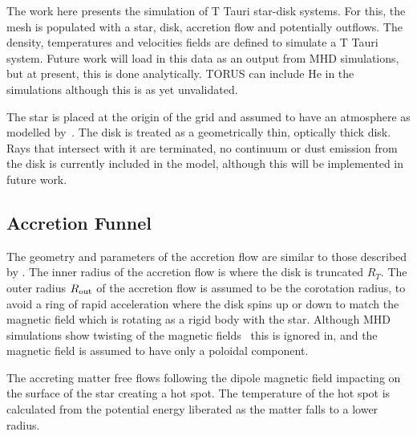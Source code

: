 \documentclass[fleqn,usenatbib]{mnras}
\begin{document}
The work here presents the simulation of T Tauri star-disk systems. For this, the mesh is populated with a star, disk, accretion flow and potentially outflows. The density, temperatures and velocities fields are defined to simulate a T Tauri system. Future work will load in this data as an output from MHD simulations, but at present, this is done analytically. TORUS can include He in the simulations although this is as yet unvalidated. 

The star is placed at the origin of the grid and assumed to have an atmosphere as modelled by~\citet{1979ApJS...40....1K}. The disk is treated as a geometrically thin, optically thick disk. Rays that intersect with it are terminated, no continuum or dust emission from the disk is currently included in the model, although this will be implemented in future work.

\subsection{Accretion Funnel}
\label{sec:accretion}
The geometry and parameters of the accretion flow are similar to those described by \citet{1998ApJ...495..385H}. The inner radius of the accretion flow is where the disk is truncated $R_{T}$. The outer radius $R_{\rm out}$ of the accretion flow is assumed to be the corotation radius, to avoid a ring of rapid acceleration where the disk spins up or down to match the magnetic field which is rotating as a rigid body with the star. Although MHD simulations show twisting of the magnetic fields~\citep[e.g.][]{Uzdensky:2002dg} this is ignored in, and the magnetic field is assumed to have only a poloidal component.

The accreting matter free flows following the dipole magnetic field impacting on the surface of the star creating a hot spot. The temperature of the hot spot is calculated from the potential energy liberated as the matter falls to a lower radius.
\end{document}
